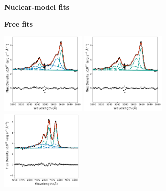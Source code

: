 \begin{figure}\ContinuedFloat
    \centering
    \begin{subfigure}[t]{0.9\linewidth}
        \begin{minipage}{0.48\linewidth}
            \centering
            \textbf{Nuclear-model fits}
        \end{minipage}
        \hfill
        \begin{minipage}{0.42\linewidth}
            \centering
            \textbf{Free fits}
        \end{minipage}
        \vfill
        \includegraphics[width=0.45\textwidth]{figures/muse_f13451_1232/line_fits/ap5_oiii.png}
        \hfill
        \includegraphics[width=0.45\textwidth]{figures/muse_f13451_1232/line_fits/ap5_oiii_no_nuclear_model.png}
        \vfill
        \includegraphics[width=0.435\textwidth]{figures/muse_f13451_1232/line_fits/ap5_halpha.png}

\end{subfigure}
\end{figure}
